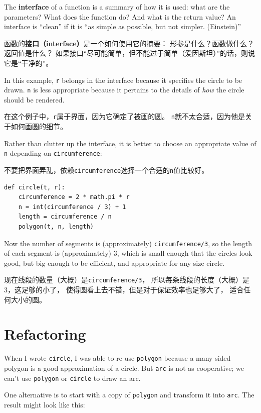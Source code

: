 \documentclass[10pt]{book}
\begin{document}
\begin{CJK}{UTF8}{gbsn}
The {\bf interface} of a function is a summary of how it is used: what
are the parameters?  What does the function do?  And what is the return
value?  An interface is ``clean'' if it is ``as simple as
possible, but not simpler. (Einstein)''

函数的{\bf 接口（interface）}是一个如何使用它的摘要：
形参是什么？函数做什么？返回值是什么？
如果接口``尽可能简单，但不能过于简单（爱因斯坦）''的话，则说它是``干净的''。

In this example, {\tt r} belongs in the interface because it
specifies the circle to be drawn.  {\tt n} is less appropriate
because it pertains to the details of {\em how} the circle should
be rendered.

在这个例子中，{\tt r}属于界面，因为它确定了被画的圆。
{\tt n}就不太合适，因为他是关于如何画圆的细节。

Rather than clutter up the interface, it is better
to choose an appropriate value of {\tt n}
depending on {\tt circumference}:

不要把界面弄乱，依赖{\tt circumference}选择一个合适的{\tt n}值比较好。

\begin{verbatim}
def circle(t, r):
    circumference = 2 * math.pi * r
    n = int(circumference / 3) + 1
    length = circumference / n
    polygon(t, n, length)
\end{verbatim}
%
Now the number of segments is (approximately) {\tt circumference/3},
so the length of each segment is (approximately) 3, which is small
enough that the circles look good, but big enough to be efficient,
and appropriate for any size circle.

现在线段的数量（大概）是{\tt circumference/3}，
所以每条线段的长度（大概）是3，这足够的小了，
使得圆看上去不错，但是对于保证效率也足够大了，
适合任何大小的圆。

\section{Refactoring}
\label{refactoring}

When I wrote {\tt circle}, I was able to re-use {\tt polygon}
because a many-sided polygon is a good approximation of a circle.
But {\tt arc} is not as cooperative; we can't use {\tt polygon}
or {\tt circle} to draw an arc.

One alternative is to start with a copy
of {\tt polygon} and transform it into {\tt arc}.  The result
might look like this:


\end{CJK}
\end{document}
